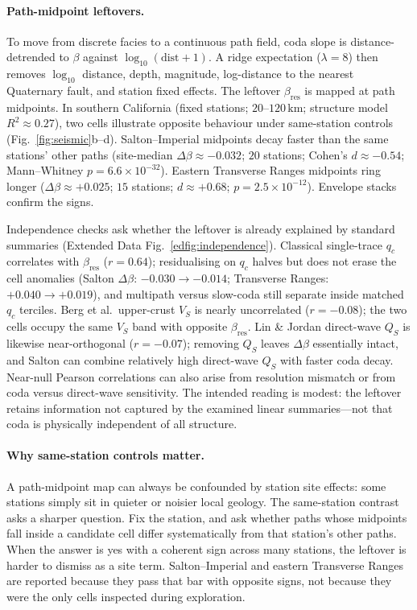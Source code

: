 \documentclass[twocolumn,10pt]{article}
\begin{document}
\paragraph{Path-midpoint leftovers.}
To move from discrete facies to a continuous path field, coda slope is
distance-detrended to \(\beta\) against \(\log_{10}(\mathrm{dist}+1)\). A ridge
expectation (\(\lambda=8\)) then removes \(\log_{10}\) distance, depth,
magnitude, log-distance to the nearest Quaternary fault, and station fixed
effects. The leftover \(\beta_{\mathrm{res}}\) is mapped at path midpoints. In
southern California (fixed stations; \(20\)--\(120\,\mathrm{km}\); structure
model \(R^{2}\approx0.27\)), two cells illustrate opposite behaviour under
same-station controls (Fig.~\ref{fig:seismic}b--d). Salton--Imperial midpoints
decay faster than the same stations' other paths (site-median
\(\Delta\beta\approx-0.032\); \(20\) stations; Cohen's \(d\approx-0.54\);
Mann--Whitney \(p=6.6\times10^{-32}\)). Eastern Transverse Ranges midpoints ring
longer (\(\Delta\beta\approx+0.025\); \(15\) stations; \(d\approx+0.68\);
\(p=2.5\times10^{-12}\)). Envelope stacks confirm the signs.

Independence checks ask whether the leftover is already explained by standard
summaries (Extended Data Fig.~\ref{edfig:independence}). Classical single-trace
\(q_c\) correlates with \(\beta_{\mathrm{res}}\) (\(r=0.64\)); residualising on
\(q_c\) halves but does not erase the cell anomalies (Salton
\(\Delta\beta\): \(-0.030\rightarrow-0.014\); Transverse Ranges:
\(+0.040\rightarrow+0.019\)), and multipath versus slow-coda still separate
inside matched \(q_c\) terciles. Berg et al.\ upper-crust \(V_S\) is nearly
uncorrelated (\(r=-0.08\)); the two cells occupy the same \(V_S\) band with
opposite \(\beta_{\mathrm{res}}\)\cite{berg2021}. Lin \& Jordan direct-wave
\(Q_S\) is likewise near-orthogonal (\(r=-0.07\)); removing \(Q_S\) leaves
\(\Delta\beta\) essentially intact, and Salton can combine relatively high
direct-wave \(Q_S\) with faster coda decay\cite{lin2023}. Near-null Pearson
correlations can also arise from resolution mismatch or from coda versus
direct-wave sensitivity. The intended reading is modest: the leftover retains
information not captured by the examined linear summaries---not that coda is
physically independent of all structure.

\paragraph{Why same-station controls matter.}
A path-midpoint map can always be confounded by station site effects: some
stations simply sit in quieter or noisier local geology. The same-station
contrast asks a sharper question. Fix the station, and ask whether paths whose
midpoints fall inside a candidate cell differ systematically from that
station's other paths. When the answer is yes with a coherent sign across many
stations, the leftover is harder to dismiss as a site term. Salton--Imperial and
eastern Transverse Ranges are reported because they pass that bar with opposite
signs, not because they were the only cells inspected during exploration.
\end{document}
